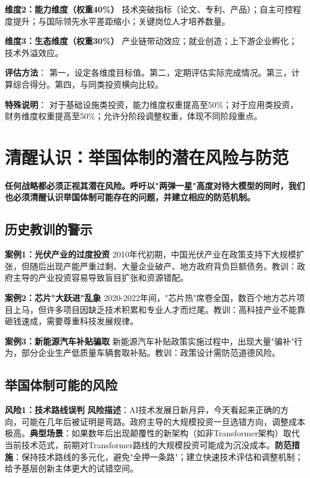 \textbf{维度2：能力维度（权重40\%）}
技术突破指标（论文、专利、产品）；自主可控程度提升；与国际领先水平差距缩小；关键岗位人才培养数量。

\textbf{维度3：生态维度（权重30\%）}
产业链带动效应；就业创造；上下游企业孵化；技术外溢效应。

\textbf{评估方法}：
第一，设定各维度目标值。第二，定期评估实际完成情况。第三，计算综合得分。第四，与同类投资横向比较。

\textbf{特殊说明}：
对于基础设施类投资，能力维度权重提高至50\%；对于应用类投资，财务维度权重提高至50\%；允许分阶段调整权重，体现不同阶段重点。

\section{清醒认识：举国体制的潜在风险与防范}

\textbf{任何战略都必须正视其潜在风险。呼吁以"两弹一星"高度对待大模型的同时，我们也必须清醒认识举国体制可能存在的问题，并建立相应的防范机制。}

\subsection{历史教训的警示}

\textbf{案例1：光伏产业的过度投资}
2010年代初期，中国光伏产业在政策支持下大规模扩张，但随后出现产能严重过剩、大量企业破产、地方政府背负巨额债务。教训：政府主导的产业投资容易导致盲目扩张和资源错配。

\textbf{案例2：芯片"大跃进"乱象}
2020-2022年间，"芯片热"席卷全国，数百个地方芯片项目上马，但许多项目因缺乏技术积累和专业人才而烂尾。教训：高科技产业不能靠砸钱速成，需要尊重科技发展规律。

\textbf{案例3：新能源汽车补贴骗取}
新能源汽车补贴政策实施过程中，出现大量"骗补"行为，部分企业生产低质量车辆套取补贴。教训：政策设计需防范道德风险。

\subsection{举国体制可能的风险}

\textbf{风险1：技术路线误判}
\textbf{风险描述}：AI技术发展日新月异，今天看起来正确的方向，可能在几年后被证明是弯路。政府主导的大规模投资一旦选错方向，调整成本极高。\textbf{典型场景}：如果数年后出现颠覆性的新架构（如非Transformer架构）取代当前技术范式，前期对Transformer路线的大规模投资可能成为沉没成本。\textbf{防范措施}：保持技术路线的多元化，避免"全押一条路"；建立快速技术评估和调整机制；给予基层创新主体更大的试错空间。

